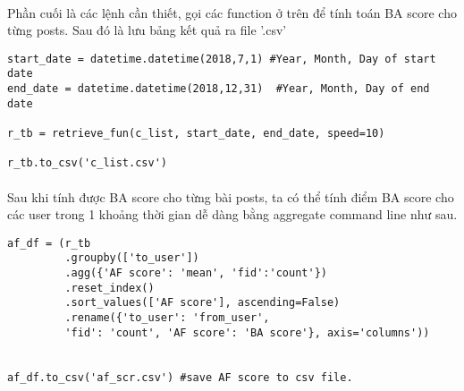 \documentclass[12pt]{article}
\numberwithin{equation}{section}
\begin{document}
\paragraph{} Phần cuối là các lệnh cần thiết, gọi các function ở trên để tính toán BA score cho từng posts. Sau đó là lưu bảng kết quả ra file '.csv'
\\

\begin{lstlisting}
start_date = datetime.datetime(2018,7,1) #Year, Month, Day of start date
end_date = datetime.datetime(2018,12,31)  #Year, Month, Day of end date

r_tb = retrieve_fun(c_list, start_date, end_date, speed=10)

r_tb.to_csv('c_list.csv')
\end{lstlisting}

\paragraph{} Sau khi tính được BA score cho từng bài posts, ta có thể tính điểm BA score cho các user trong 1 khoảng thời gian dễ dàng bằng aggregate command line như sau.

\begin{lstlisting}
af_df = (r_tb
         .groupby(['to_user'])
         .agg({'AF score': 'mean', 'fid':'count'})
         .reset_index()
         .sort_values(['AF score'], ascending=False)
         .rename({'to_user': 'from_user',
         'fid': 'count', 'AF score': 'BA score'}, axis='columns'))


af_df.to_csv('af_scr.csv') #save AF score to csv file.
\end{lstlisting}

\nocite{*}


\end{document}
